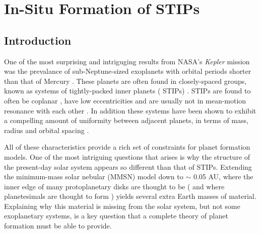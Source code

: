 \chapter {In-Situ Formation of STIPs}


\section{Introduction} \label{sec:intro}

One of the most surprising and intriguging results from NASA's \textit{Kepler} mission was the prevalance 
of sub-Neptune-sized exoplanets with orbital periods shorter than that of Mercury \cite{borucki10}. These 
planets are often found in closely-spaced groups, known as systems of tightly-packed inner planets (
STIPs) \cite{latham11, lissauer11, lissauer14}. STIPs are found to often be coplanar 
\cite{fang12, tremaine12}, have low eccentricities \cite{vaneylen15, hadden17} and are usually not in 
mean-motion resonance with each other \cite{fabrycky14, steffen15}. In addition these systems have been 
shown to exhibit a compelling amount of uniformity between adjacent planets, in terms of mass, radius and 
orbital spacing \cite{millholland17, millholland21}.

All of these characteristics provide a rich set of constraints for planet formation models. One of the 
most intriguing questions that arises is why the structure of the present-day solar system appears so 
different than that of STIPs. Extending the minimum-mass solar nebular (MMSN) model \cite{hayashi81} down 
to $\sim$ 0.05 AU, where the inner edge of many protoplanetary disks are thought to be \cite{meyer97} (
and where planetesimals are thought to form \cite{mulders18}) yields several extra Earth masses of 
material. Explaining why this material is missing from the solar system, but not some exoplanetary 
systems, is a key question that a complete theory of planet formation must be able to provide.

